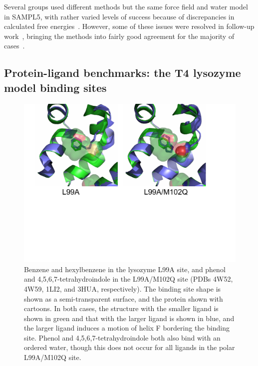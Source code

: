 \documentclass[aps,pre,twocolumn,nofootinbib,superscriptaddress,10pt, final,tightenlines]{revtex4-1}
\begin{document}

Several groups used different methods but the same force field and water model in SAMPL5, with rather varied levels of success because of discrepancies in calculated free energies~\cite{yin_sampl5_preprint, bosisio_blinded_2016, bhakat_resolving_2016}. 
However, some of these issues were resolved in follow-up work~\cite{bhakat_resolving_2016}, bringing the methods into fairly good agreement for the majority of cases~\cite{yin_sampl5_2016, bosisio_blinded_2016}.

\subsection{Protein-ligand benchmarks: the T4 lysozyme model binding sites}

\begin{figure}
\includegraphics[width=\textwidth]{figures/lysozyme.pdf}
\caption{\label{fig:lysozyme} Benzene and hexylbenzene in the lysozyme L99A site, and phenol and 4,5,6,7-tetrahydroindole in the L99A/M102Q site (PDBs 4W52, 4W59, 1LI2, and 3HUA, respectively). The binding site shape is shown as a semi-transparent surface, and the protein shown with cartoons. In both cases, the structure with the smaller ligand is shown in green and that with the larger ligand is shown in blue, and the larger ligand induces a motion of helix F bordering the binding site. Phenol and 4,5,6,7-tetrahydroindole both also bind with an ordered water, though this does not occur for all ligands in the polar L99A/M102Q site.}
\end{figure}
\end{document}
